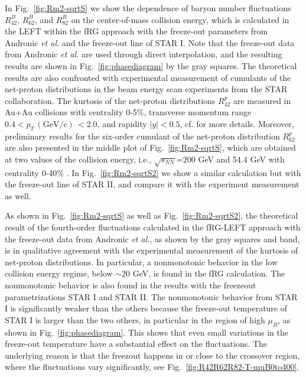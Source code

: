 \documentclass[%
reprint,
superscriptaddress,
showpacs,preprintnumbers,
amsmath,amssymb,
aps,
prd,
]{revtex4-1}
\def\Fig#1{Fig.~\ref{#1}} \def\Tab#1{Tab.~\ref{#1}}
\begin{document}
	In \Fig{fig:Rm2-sqrtS} we show the dependence of baryon number fluctuations $R^{B}_{42}$, $R^{B}_{62}$, and $R^{B}_{82}$ on the center-of-mass collision energy, which is calculated in the LEFT within the fRG approach with the freeze-out parameters from Andronic {\it et al.} \cite{Andronic:2017pug} and the freeze-out line of STAR I. Note that the freeze-out data from Andronic {\it et al.} are used through direct interpolation, and the resulting results are shown in \Fig{fig:phasediagram} by the gray squares. The theoretical results are also confronted with experimental measurement of cumulants of the net-proton distributions in the beam energy scan experiments from the STAR collaboration. The kurtosis of the net-proton distributions $R^{p}_{42}$ are measured in Au+Au collisions with centrality 0-5\%, transverse momentum range $0.4< p_T\,(\mathrm{GeV}/c)\,<2.0$, and rapidity $|y|<0.5$, cf. \cite{Adam:2020unf} for more details. Moreover, preliminary results for the six-order cumulant of the net-proton distribution $R^{p}_{62}$ are also presented in the middle plot of \Fig{fig:Rm2-sqrtS}, which are obtained at two values of the collision energy, i.e., $\sqrt{s_{NN}}$=200 GeV and 54.4 GeV with centrality 0-40\% \cite{Nonaka:2020crv,Pandav:2020uzx}. In \Fig{fig:Rm2-sqrtS2} we show a similar calculation but with the freeze-out line of STAR II, and compare it with the experiment measurement as well.
	
	As shown in \Fig{fig:Rm2-sqrtS} as well as \Fig{fig:Rm2-sqrtS2}, the theoretical result of the fourth-order fluctuations calculated in the fRG-LEFT approach with the freeze-out data from Andronic {\it et al.}, as shown by the gray squares and band, is in qualitative agreement with the experimental measurement of the kurtosis of net-proton distributions.  In particular, a nonmonotonic behavior in the low collision energy regime, below $\sim 20$ GeV, is found in the fRG calculation. The nonmonotonic behavior is also found in the results with the freezeout parametrizations STAR I and STAR II. The nonmonotonic behavior from STAR I is significantly weaker than the others because the freeze-out temperature of STAR I is larger than the two others, in particular in the region of high $\mu_B$, as shown in \Fig{fig:phasediagram}. This shows that even small variations in the freeze-out temperature have a substantial effect on the fluctuations. The underlying reason is that the freezout happens in or close to the crossover region, where the fluctuations vary significantly, see \Fig{fig:R42R62R82-T-muB0to400}.
	
\end{document}
